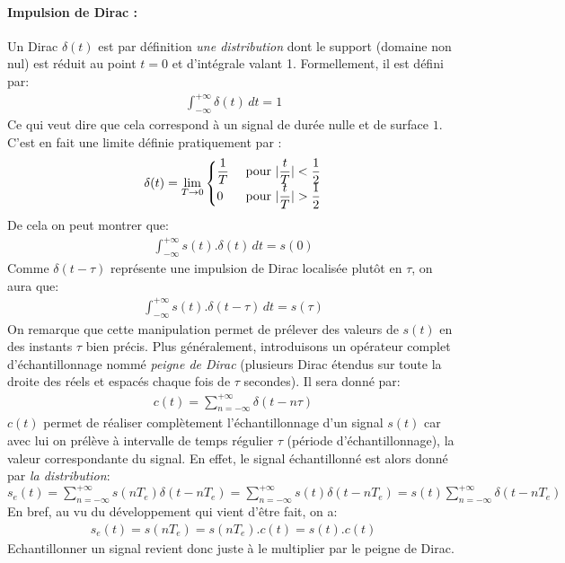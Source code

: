 \paragraph{Impulsion de Dirac\cite{TraitSignMath} :}
Un Dirac $ \delta(t) $ est par définition \emph{une distribution} dont le support (domaine non nul) est réduit au point $ t = 0 $ et d'intégrale valant 1. Formellement, il est défini par:
\begin{eqnarray}
\int_{-\infty}^{+\infty}\delta(t)\,dt = 1
\end{eqnarray}
Ce qui veut dire que cela correspond à un signal de durée nulle et de surface $ 1 $. C'est en fait une limite définie pratiquement par \cite{Unified}:
\begin{eqnarray}
\delta(t) = \lim_{T \to 0}
\begin{cases}
\dfrac{1}{T} & \text{  pour  $ \lvert \dfrac{t}{T} \rvert <\dfrac{1}{2} $}\\
0 & \text{  pour  $ \lvert \dfrac{t}{T} \rvert >\dfrac{1}{2} $} 
\end{cases}
\end{eqnarray}
De cela on peut montrer que:
\begin{eqnarray}
\int_{-\infty}^{+\infty}s(t).\delta(t)\,dt = s(0)
\end{eqnarray}
Comme $ \delta(t-\tau) $ représente une impulsion de Dirac localisée plutôt en $ \tau $, on aura que:
\begin{eqnarray}\label{FonctionVsDirac}
\int_{-\infty}^{+\infty}s(t).\delta(t-\tau)\,dt = s(\tau)
\end{eqnarray}
On remarque que cette manipulation permet de prélever des valeurs de $ s(t) $ en des instants $ \tau $ bien précis. Plus généralement, introduisons un opérateur complet d'échantillonnage nommé \emph{peigne de Dirac} (plusieurs Dirac étendus sur toute la droite des réels et espacés chaque fois de $ \tau $ secondes). Il sera donné par:
\begin{eqnarray}\label{peigneDirac}
c(t) = \sum_{n=-\infty}^{+\infty}\delta(t-n\tau)
\end{eqnarray}
$ c(t) $ permet de réaliser complètement l'échantillonnage d'un signal $ s(t) $ car avec lui on prélève à intervalle de temps régulier $ \tau $ (période d'échantillonnage), la valeur correspondante du signal. En effet, le signal échantillonné est alors donné par \emph{la distribution}:\\
$ s_{e}(t) = \sum_{n=-\infty}^{+\infty}s(nT_{e})\delta(t-nT_{e})
= \sum_{n=-\infty}^{+\infty}s(t)\delta(t-nT_{e})
= s(t)\sum_{n=-\infty}^{+\infty}\delta(t-nT_{e}) $\\
En bref, au vu du développement qui vient d'être fait, on a:
\begin{eqnarray}\label{SignEchantillonDirac}
s_{e}(t) = s(nT_{e}) = s(nT_{e}).c(t) = s(t).c(t)
\end{eqnarray}
Echantillonner un signal revient donc juste à le multiplier par le peigne de Dirac.
